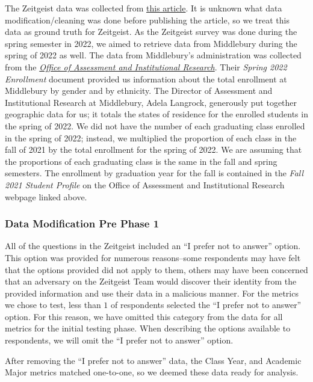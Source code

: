 \documentclass[
]{article}
\begin{document}
The Zeitgeist data was collected from
\href{https://www.middleburycampus.com/article/2022/05/zeitgeist-4-0-2022}{this article}.
It is unknown what data modification/cleaning was done before publishing
the article, so we treat this data as ground truth for Zeitgeist. As the
Zeitgeist survey was done during the spring semester in 2022, we aimed
to retrieve data from Middlebury during the spring of 2022 as well. The
data from Middlebury's administration was collected from the
\href{Undergraduate College | Middlebury}{\textit{Office of Assessment and Institutional Research}}.
Their \textit{Spring 2022 Enrollment} document provided us information
about the total enrollment at Middlebury by gender and by ethnicity. The
Director of Assessment and Institutional Research at Middlebury, Adela
Langrock, generously put together geographic data for us; it totals the
states of residence for the enrolled students in the spring of 2022. We
did not have the number of each graduating class enrolled in the spring
of 2022; instead, we multiplied the proportion of each class in the fall
of 2021 by the total enrollment for the spring of 2022. We are assuming
that the proportions of each graduating class is the same in the fall
and spring semesters. The enrollment by graduation year for the fall is
contained in the \textit{Fall 2021 Student Profile} on the Office of
Assessment and Institutional Research webpage linked above.

\hypertarget{data-modification-pre-phase-1}{%
\subsubsection{Data Modification Pre Phase
1}\label{data-modification-pre-phase-1}}

All of the questions in the Zeitgeist included an ``I prefer not to
answer'' option. This option was provided for numerous reasons--some
respondents may have felt that the options provided did not apply to
them, others may have been concerned that an adversary on the Zeitgeist
Team would discover their identity from the provided information and use
their data in a malicious manner. For the metrics we chose to test, less
than \(1%
\) of respondents selected the ``I prefer not to answer'' option. For
this reason, we have omitted this category from the data for all metrics
for the initial testing phase. When describing the options available to
respondents, we will omit the ``I prefer not to answer'' option.

After removing the ``I prefer not to answer'' data, the Class Year, and
Academic Major metrics matched one-to-one, so we deemed these data ready
for analysis.
\end{document}
